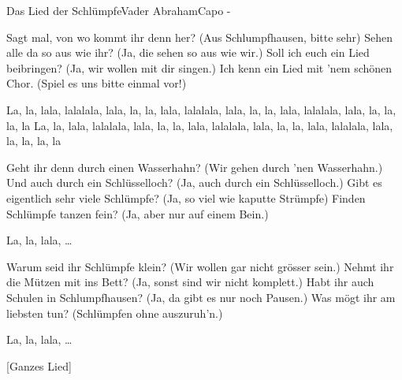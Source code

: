 \begin{song}{Das Lied der Schlümpfe}{Vader Abraham}{Capo -}

Sagt mal, von wo kommt ihr denn her? (Aus Schlumpfhausen, bitte sehr)
Sehen alle da so aus wie ihr? (Ja, die sehen so aus wie wir.)
Soll ich euch ein Lied beibringen? (Ja, wir wollen mit dir singen.)
Ich kenn ein Lied mit 'nem schönen Chor. (Spiel es uns bitte einmal vor!)

La, la, lala, lalalala, lala, la, la, lala, lalalala, lala, 
la, la, lala, lalalala, lala, la, la, la, la
La, la, lala, lalalala, lala, la, la, lala, lalalala, lala, 
la, la, lala, lalalala, lala, la, la, la, la

Geht ihr denn durch einen Wasserhahn? (Wir gehen durch 'nen Wasserhahn.)
Und auch durch ein Schlüsselloch? (Ja, auch durch ein Schlüsselloch.)
Gibt es eigentlich sehr viele Schlümpfe? (Ja, so viel wie kaputte Strümpfe)
Finden Schlümpfe tanzen fein? (Ja, aber nur auf einem Bein.)

 
La, la, lala, \dots

Warum seid ihr Schlümpfe klein? (Wir wollen gar nicht grösser sein.)
Nehmt ihr die Mützen mit ins Bett? (Ja, sonst sind wir nicht komplett.)
Habt ihr auch Schulen in Schlumpfhausen? (Ja, da gibt es nur noch Pausen.)
Was mögt ihr am liebsten tun? (Schlümpfen ohne auszuruh'n.)

 
La, la, lala, \dots {}




[Ganzes Lied]
\end{song}